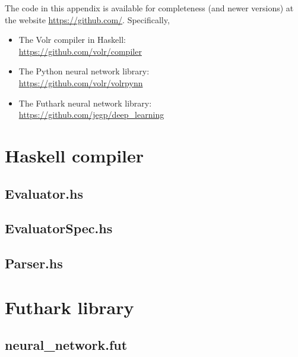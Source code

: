 
The code in this appendix is available for completeness (and newer versions) 
at the website \url{https://github.com/}. Specifically,
\begin{itemize}
  \item The Volr compiler in Haskell: \\ \url{https://github.com/volr/compiler}
  \item The Python neural network library: \\ \url{https://github.com/volr/volrpynn}
  \item The Futhark neural network library: \\ \url{https://github.com/jegp/deep_learning}
\end{itemize}

\lstset{mathescape=false,showstringspaces=false,breaklines=true,basicstyle=\ttfamily\scriptsize}

\section{Haskell compiler}
\subsection{Evaluator.hs}


\subsection{EvaluatorSpec.hs}


\subsection{Parser.hs} \label{app:implementation_parser}


\section{Futhark library}
\subsection{neural\_network.fut} \label{app:implementation_fut_nn}


